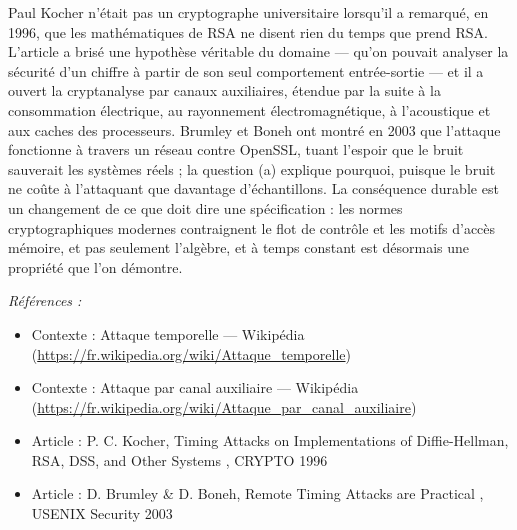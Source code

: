 \documentclass[11pt]{article}
\newenvironment{refs}{\par\small\noindent\emph{Références :}\begin{itemize}\setlength\itemsep{0pt}}{\end{itemize}\normalsize}
\begin{document}
\noindent Paul Kocher n'était pas un cryptographe universitaire lorsqu'il a remarqué,
en 1996, que les mathématiques de RSA ne disent rien du temps que prend RSA. L'article a
brisé une hypothèse véritable du domaine --- qu'on pouvait analyser la sécurité d'un chiffre à
partir de son seul comportement entrée-sortie --- et il a ouvert la cryptanalyse par canaux
auxiliaires, étendue par la suite à la consommation électrique, au rayonnement
électromagnétique, à l'acoustique et aux caches des processeurs. Brumley et Boneh ont montré
en 2003 que l'attaque fonctionne à travers un réseau contre OpenSSL, tuant l'espoir que le
bruit sauverait les systèmes réels ; la question (a) explique pourquoi, puisque le bruit ne
coûte à l'attaquant que davantage d'échantillons. La conséquence durable est un changement de
ce que doit dire une spécification : les normes cryptographiques modernes contraignent le
flot de contrôle et les motifs d'accès mémoire, et pas seulement l'algèbre, et \og{} à temps
constant \fg{} est désormais une propriété que l'on démontre.

\begin{refs}
\item Contexte : Attaque temporelle --- Wikipédia (\url{https://fr.wikipedia.org/wiki/Attaque_temporelle})
\item Contexte : Attaque par canal auxiliaire --- Wikipédia (\url{https://fr.wikipedia.org/wiki/Attaque_par_canal_auxiliaire})
\item Article : P. C. Kocher, \og{} Timing Attacks on Implementations of Diffie-Hellman, RSA, DSS, and Other Systems \fg{}, CRYPTO 1996
\item Article : D. Brumley \& D. Boneh, \og{} Remote Timing Attacks are Practical \fg{}, USENIX Security 2003
\end{refs}

\bigskip
\end{document}
